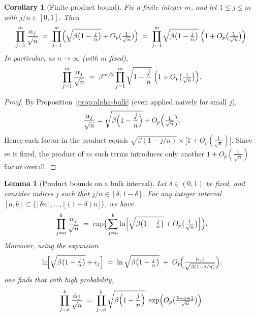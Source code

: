 \documentclass[letterpaper,11pt,oneside,reqno]{article}
\numberwithin{equation}{section}
\newtheorem{lemma}[proposition]{Lemma}
\newtheorem{corollary}[proposition]{Corollary}
\theoremstyle{definition}
\begin{document}
\begin{corollary}[Finite product bound]
\label{cor:finite-product}
Fix a finite integer $m$, and let $1 \le j \le m$ with $j/n \in [0,1]$.  Then
\[
  \prod_{j=1}^m \frac{\alpha_j}{\sqrt{n}}
  \;=\;
  \prod_{j=1}^m
    \Bigl(\sqrt{\beta\bigl(1 - \tfrac{j}{n}\bigr)} + O_p(\tfrac{1}{\sqrt{n}})\Bigr)
  \;=\;
  \prod_{j=1}^m \sqrt{\beta\bigl(1-\tfrac{j}{n}\bigr)}
  \;\Bigl(1 + O_p\bigl(\tfrac{1}{\sqrt{n}}\bigr)\Bigr).
\]
In particular, as $n\to\infty$ (with $m$ fixed),
\[
  \prod_{j=1}^m \frac{\alpha_j}{\sqrt{n}}
  \;=\;
  \beta^{m/2}
  \prod_{j=1}^m \sqrt{1 - \frac{j}{n}}
  \;\Bigl(1 + O_p\bigl(\tfrac{1}{\sqrt{n}}\bigr)\Bigr).
\]
\end{corollary}

\begin{proof}
By Proposition~\ref{prop:alpha-bulk} (even applied naively for small $j$),
\[
  \frac{\alpha_j}{\sqrt{n}}
  =
  \sqrt{\beta\Bigl(1 - \frac{j}{n}\Bigr)} + O_p\Bigl(\tfrac{1}{\sqrt{n}}\Bigr).
\]
Hence each factor in the product equals
\(\sqrt{\beta(1 - j/n)}\times\bigl[1 + O_p(\tfrac{1}{\sqrt{n}})\bigr]\).
Since $m$ is fixed, the product of $m$ such terms introduces only another
$1 + O_p(\tfrac{1}{\sqrt{n}})$ factor overall.
\end{proof}

\begin{lemma}[Product bounds on a bulk interval]
\label{lem:prod-bulk}
Let $\delta \in (0,1)$ be fixed, and consider indices $j$ such that $j/n \in [\delta,1-\delta]$.
For any integer interval $[a,b]\subset \{\lceil \delta n\rceil,\dots,\lfloor(1-\delta)n\rfloor\}$, we have
\[
  \prod_{j=a}^b \frac{\alpha_j}{\sqrt{n}}
  \;=\;
  \exp\Bigl(\sum_{j=a}^b
    \ln\Bigl[\sqrt{\beta\bigl(1-\tfrac{j}{n}\bigr)} + O_p\bigl(\tfrac{1}{\sqrt{n}}\bigr)\Bigr]
  \Bigr).
\]
Moreover, using the expansion
\[
  \ln\!\Bigl[\sqrt{\beta\bigl(1-\tfrac{j}{n}\bigr)} + \epsilon_j\Bigr]
  \;=\;
  \ln\sqrt{\beta\bigl(1-\tfrac{j}{n}\bigr)} \;+\; O_p\!\Bigl(\tfrac{|\epsilon_j|}{\sqrt{\beta(1-j/n)}}\Bigr),
\]
one finds that with high probability,
\[
  \prod_{j=a}^b \frac{\alpha_j}{\sqrt{n}}
  \;=\;
  \prod_{j=a}^b \sqrt{\beta\Bigl(1 - \frac{j}{n}\Bigr)}
  \;\exp\Bigl( O_p\bigl(\tfrac{b-a+1}{\sqrt{n}}\bigr)\Bigr).
\]
\end{lemma}
\end{document}
